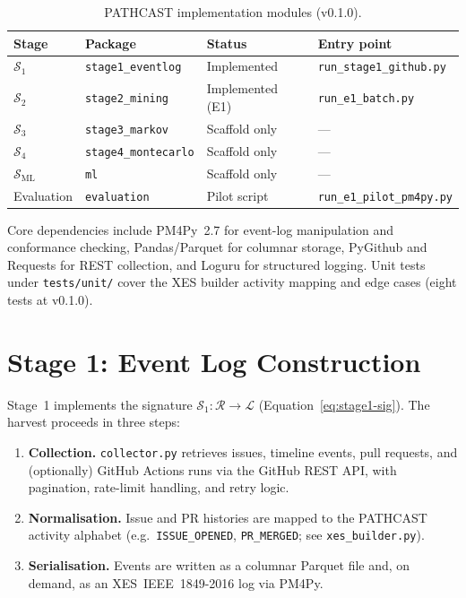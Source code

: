 \begin{table}[htbp]
\centering
\caption{PATHCAST implementation modules (v0.1.0).}
\label{tab:impl-modules}
\small
\begin{tabular}{llll}
\toprule
\textbf{Stage} & \textbf{Package} & \textbf{Status} & \textbf{Entry point} \\
\midrule
$\mathcal{S}_1$ & \texttt{stage1\_eventlog} & Implemented & \texttt{run\_stage1\_github.py} \\
$\mathcal{S}_2$ & \texttt{stage2\_mining}    & Implemented (E1) & \texttt{run\_e1\_batch.py} \\
$\mathcal{S}_3$ & \texttt{stage3\_markov}    & Scaffold only & --- \\
$\mathcal{S}_4$ & \texttt{stage4\_montecarlo}& Scaffold only & --- \\
$\mathcal{S}_{\text{ML}}$ & \texttt{ml}        & Scaffold only & --- \\
Evaluation      & \texttt{evaluation}        & Pilot script  & \texttt{run\_e1\_pilot\_pm4py.py} \\
\bottomrule
\end{tabular}
\end{table}

Core dependencies include PM4Py~2.7 for event-log manipulation and conformance
checking, Pandas/Parquet for columnar storage, PyGithub and Requests for REST
collection, and Loguru for structured logging. Unit tests under
\texttt{tests/unit/} cover the XES builder activity mapping and edge cases
(eight tests at v0.1.0).


\section{Stage 1: Event Log Construction}
\label{sec:impl-stage1}

Stage~1 implements the signature $\mathcal{S}_1 : \mathcal{R} \to \mathcal{L}$
(Equation~\ref{eq:stage1-sig}). The harvest proceeds in three steps:
\begin{enumerate}
    \item \textbf{Collection.} \texttt{collector.py} retrieves issues, timeline
    events, pull requests, and (optionally) GitHub Actions runs via the GitHub
    REST API, with pagination, rate-limit handling, and retry logic.
    \item \textbf{Normalisation.} Issue and PR histories are mapped to the
    PATHCAST activity alphabet (e.g.\ \texttt{ISSUE\_OPENED},
    \texttt{PR\_MERGED}; see \texttt{xes\_builder.py}).
    \item \textbf{Serialisation.} Events are written as a columnar Parquet file
    and, on demand, as an XES~IEEE~1849-2016 log via PM4Py.
\end{enumerate}

